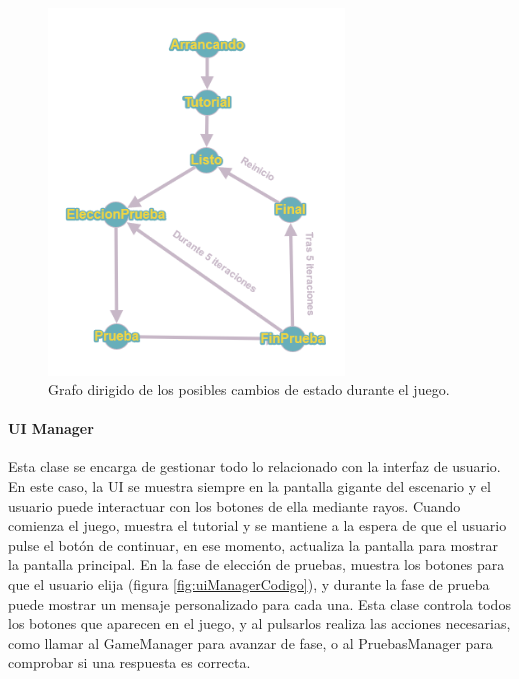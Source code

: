 \begin{figure}
	\centering
	\includegraphics[width=0.7\textwidth]{04.Desarrollo/05.Entrega5/01.Iteracion5_1/00.Figuras/10.grafo_estados.png}
	\caption{Grafo dirigido de los posibles cambios de estado durante el juego.}
	\label{fig:grafoEstados}
\end{figure}




\paragraph{UI Manager}
Esta clase se encarga de gestionar todo lo relacionado con la interfaz de usuario. En este caso, la UI se muestra siempre en la pantalla gigante del escenario y el usuario puede interactuar con los botones de ella mediante rayos. Cuando comienza el juego, muestra el tutorial y se mantiene a la espera de que el usuario pulse el botón de continuar, en ese momento, actualiza la pantalla para mostrar la pantalla principal. En la fase de elección de pruebas, muestra los botones para que el usuario elija (figura \ref{fig:uiManagerCodigo}), y durante la fase de prueba puede mostrar un mensaje personalizado para cada una. Esta clase controla todos los botones que aparecen en el juego, y al pulsarlos realiza las acciones necesarias, como llamar al GameManager para avanzar de fase, o al PruebasManager para comprobar si una respuesta es correcta. 

